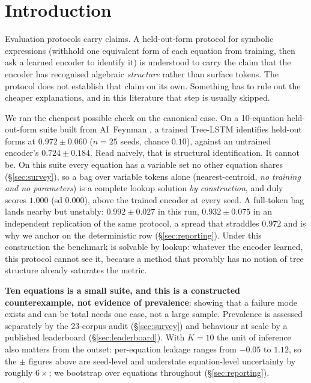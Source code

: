 \section{Introduction}
\label{sec:introduction}

Evaluation protocols carry claims. A held-out-form protocol for symbolic expressions (withhold
one equivalent form of each equation from training, then ask a learned encoder to identify it)
is understood to carry the claim that the encoder has recognised algebraic \emph{structure} rather
than surface tokens. The protocol does not establish that claim on its own. Something has to rule
out the cheaper explanations, and in this literature that step is usually skipped.

We ran the cheapest possible check on the canonical case. On a 10-equation held-out-form suite
built from AI~Feynman \citep{udrescu2020ai}, a trained Tree-LSTM identifies held-out forms at
$0.972 \pm 0.060$ ($n{=}25$ seeds, chance $0.10$), against an untrained encoder's
$0.724 \pm 0.184$. Read naively, that is structural identification. It cannot be. On this suite every equation has a
variable set no other equation shares (\S\ref{sec:survey}), so a bag over variable tokens alone
(nearest-centroid, \emph{no training and no parameters}) is a complete lookup solution \emph{by
construction}, and duly scores $1.000$ (sd $0.000$), above the trained encoder at every seed. A
full-token bag lands nearby but unstably: $0.992 \pm 0.027$ in this run, $0.932 \pm 0.075$ in an
independent replication of the same protocol, a spread that straddles $0.972$ and is why we anchor
on the deterministic row (\S\ref{sec:reporting}). Under this construction the benchmark is solvable
by lookup: whatever the encoder learned, this protocol cannot see it, because a method that provably
has no notion of tree structure already saturates the metric.

\textbf{Ten equations is a small suite, and this is a constructed counterexample, not evidence of
prevalence}: showing that a failure mode exists and can be total needs one case, not a large
sample. Prevalence is assessed separately by the 23-corpus audit (\S\ref{sec:survey}) and behaviour
at scale by a published leaderboard (\S\ref{sec:leaderboard}). With $K{=}10$ the unit of inference
also matters from the outset: per-equation leakage ranges from $-0.05$ to $1.12$, so the $\pm$
figures above are seed-level and understate equation-level uncertainty by roughly $6\times$; we
bootstrap over equations throughout (\S\ref{sec:reporting}).

